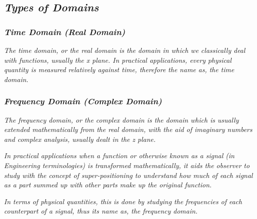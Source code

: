 

\subsection{\textit{Types of Domains}}
	
	\subsubsection{\textit{Time Domain (Real Domain)}}
	
		\textit{The time domain, or the real domain is the domain in which we classically deal with functions, usually the x plane. In practical applications, every physical quantity is measured relatively against time, therefore the name as, the time domain.}	
	
	\subsubsection{\textit{Frequency Domain (Complex Domain)}}

		\textit{The frequency domain, or the complex domain is the domain which is usually extended mathematically from the real domain, with the aid of imaginary numbers and complex analysis, usually dealt in the z plane.}	

		\textit{In practical applications when a function or otherwise known as a signal (in Engineering terminologies) is transformed mathematically, it aids the observer to study with the concept of super-positioning to understand how much of each signal as a part summed up with other parts make up the original function.}

		\textit{In terms of physical quantities, this is done by studying the frequencies of each counterpart of a signal, thus its name as, the frequency domain.}


